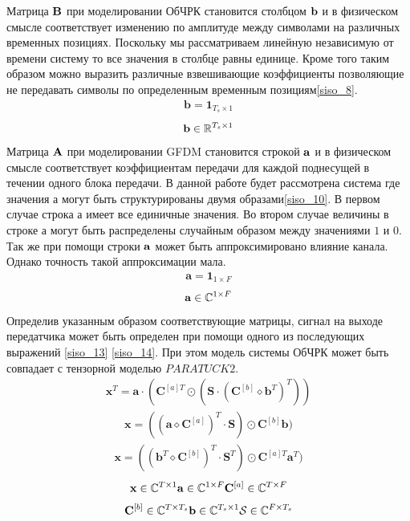 Матрица $\mathbf{B}$ при моделировании ОбЧРК становится столбцом $\mathbf{b}$ и в физическом смысле соответствует изменению по амплитуде между символами на различных временных позициях\cite{Book34}. Поскольку мы рассматриваем линейную независимую от времени систему то все значения в столбце равны единице. Кроме того таким образом можно выразить различные взвешивающие коэффициенты позволяющие не передавать символы по определенным временным позициям\eqref{siso_8}.
\begin{align}
\mathbf{b}=\mathbf{1}_{T_s\times 1} \label{siso_8}
\end{align}
\begin{align}
\mathbf{b}\in \mathbb{R}^{T_s\times 1} \label{siso_9}
\end{align}
Матрица $\mathbf{A}$ при моделировании GFDM становится строкой $\mathbf{a}$ и в физическом смысле соответствует коэффициентам передачи для каждой поднесущей в течении одного блока передачи. В данной работе будет рассмотрена система где значения а могут быть структурированы двумя образами\eqref{siso_10}. В первом случае строка а имеет все единичные значения. Во втором случае величины в строке а могут быть распределены случайным образом между значениями $1$ и $0$. Так же при помощи строки $\mathbf{a}$ может быть   аппроксимировано влияние канала. Однако точность такой аппроксимации мала.
\begin{align}
\mathbf{a}=\mathbf{1}_{1\times F} \label{siso_10}
\end{align}
\begin{align}
\mathbf{a}\in \mathbb{C}^{1\times F} \label{siso_11}
\end{align}
Определив указанным образом соответствующие матрицы, сигнал на выходе передатчика может быть определен при помощи одного из последующих выражений \eqref{siso_13} \eqref{siso_14}. При этом модель системы ОбЧРК может быть совпадает с тензорной моделью $PARATUCK2$.
\begin{align}
\mathbf{x}^T=\mathbf{a}\cdot (\mathbf{C}^{[a]T} \odot (\mathbf{S}\cdot (\mathbf{C}^{[b]}\diamond \mathbf{b}^T)^T)) \label{siso_12}
\end{align}
\begin{align}
\mathbf{x}=((\mathbf{a}\diamond \mathbf{C}^{[a]})^T \cdot \mathbf{S}) \odot \mathbf{C}^{[b]} \mathbf{b}) \label{siso_13}
\end{align}
\begin{align}
\mathbf{x}=((\mathbf{b}^T\diamond \mathbf{C}^{[b]})^T \cdot \mathbf{S}^T) \odot \mathbf{C}^{[a]T} \mathbf{a}^T) \label{siso_14}
\end{align}
\begin{align*}
\mathbf{x} \in \mathbb{C}^{T\times 1 }
\mathbf{a} \in \mathbb{C}^{1\times F}
\mathbf{C}^{[a]} \in \mathbb{C}^{T\times  F}
\end{align*}
\begin{align*}
\mathbf{C}^{[b]} \in \mathbb{C}^{T \times T_s}
\mathbf{b} \in \mathbb{C}^{T_s\times 1}
\mathcal{S} \in \mathbb{C}^{F\times T_s }
\end{align*}
